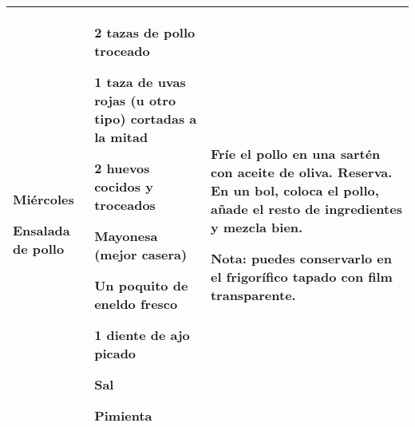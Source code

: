 \documentclass[menu.tex]{subfiles}
\begin{document}
\begin{tabular} {p{3cm} p{4.5cm} p{9cm}}
\pbox{20cm}
{
    \rule{0pt}{3ex}\begin{large}\textbf{Miércoles}\end{large}\\ 
    \rule{0pt}{2ex}Ensalada de pollo
} & 
\vspace{-0.4cm}            
\begin{compactitem} 
    \begin{scriptsize}
        \item 2 tazas de pollo troceado
        \item 1 taza de uvas rojas (u otro tipo) cortadas a la mitad
        \item 2 huevos cocidos y troceados
        \item Mayonesa (mejor casera)
        \item Un poquito de eneldo fresco
        \item 1 diente de ajo picado
        \item Sal
        \item Pimienta
    \end{scriptsize}
\end{compactitem}&
\vspace{-0.4cm}        
Fríe el pollo en una sartén con aceite de oliva. Reserva.
En un bol, coloca el pollo, añade el resto de ingredientes y mezcla bien.

Nota: puedes conservarlo en el frigorífico tapado con film transparente.\\
\hline


\end{tabular}
\end{document}
